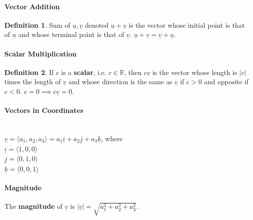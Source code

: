 \documentclass[12 pt]{article}
\theoremstyle{definition}
\newtheorem{defn}{Definition}
\begin{document}
	\paragraph{Vector Addition} 
	\begin{defn}
		Sum of $\underline{u},\underline{v}$ denoted $\underline{u}+\underline{v}$ is the vector whose initial point is that of $\underline{u}$ and whose terminal point is that of $\underline{v}$. $\underline{u}+\underline{v}=\underline{v}+\underline{u}.$
	\end{defn}
	\paragraph{Scalar Multiplication} \begin{defn}
		If $c$ is a \textbf{scalar}, i.e. $c\in \mathbb{R}$, then $c\underline{v}$ is the vector whose length is $|c|$ times the length of $\underline{v}$ and whose direction is the same as $\underline{v}$ if $c>0$ and opposite if $c<0$. $c=0 \implies c\underline{v}=\underline{0}$.
	\end{defn}
	\paragraph{Vectors in Coordinates}
	~\\$\underline{v}=\langle a_1, a_2, a_3 \rangle = a_1 \underline{i}+a_2\underline{j}+a_3\underline{k}$, where
	\\$\underline{i}=\langle 1,0,0 \rangle$
	\\$\underline{j}=\langle 0,1,0 \rangle$
	\\$\underline{k}=\langle 0,0,1 \rangle$
	\paragraph{Magnitude} The \textbf{magnitude} of $\underline{v}$ is $|\underline{v}|=\sqrt{a_1^2+a_2^2+a_3^2}$.
\end{document}
